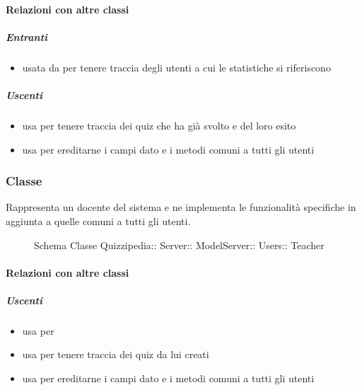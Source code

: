 \paragraph{Relazioni con altre classi}
\subparagraph{Entranti}
\begin{itemize}
\item usata da  per tenere traccia degli utenti a cui le statistiche si riferiscono
\end{itemize}
\subparagraph{Uscenti}
\begin{itemize}
\item usa  per tenere traccia dei quiz che ha già svolto e del loro esito
\item usa  per ereditarne i campi dato e i metodi comuni a tutti gli utenti
\end{itemize}
\subsubsection{Classe }
Rappresenta un docente del sistema e ne implementa le funzionalità specifiche in aggiunta a quelle comuni a tutti gli utenti.
\begin{figure}[H]
\centering
\noindent{}
\caption[Schema Classe Teacher]{Schema Classe Quizzipedia:: Server:: ModelServer:: Users:: Teacher}
\end{figure}
\paragraph{Relazioni con altre classi}
\subparagraph{Uscenti}
\begin{itemize}
\item usa  per 
\item usa  per tenere traccia dei quiz da lui creati
\item usa  per ereditarne i campi dato e i metodi comuni a tutti gli utenti
\end{itemize}
